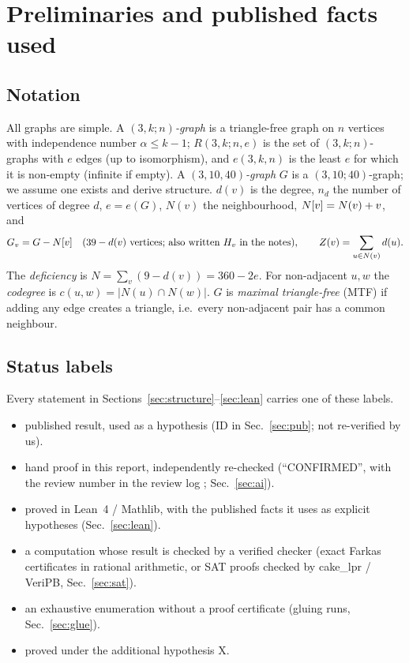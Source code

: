 \section{Preliminaries and published facts used}\label{sec:prelim}

\subsection{Notation}\label{sec:notation}
All graphs are simple. A \emph{$(3,k;n)$-graph} is a triangle-free graph on $n$ vertices with independence number
$\alpha \le k-1$; $R(3,k;n,e)$ is the set of $(3,k;n)$-graphs with $e$ edges (up to isomorphism), and $e(3,k,n)$ is the
least $e$ for which it is non-empty (infinite if empty). A \emph{$(3,10,40)$-graph} $G$ is a $(3,10;40)$-graph; we assume
one exists and derive structure. $d(v)$ is the degree, $n_d$ the number of vertices of degree $d$, $e = e(G)$,
$N(v)$ the neighbourhood, $N[v] = N(v) + v$, and
\[
  G_{v} = G - N[v] \quad (39 - d(v) \text{ vertices; also written } H_v \text{ in the notes}), \qquad Z(v) = \sum_{u \in N(v)} d(u).
\]
The \emph{deficiency} is $N = \sum_v (9 - d(v)) = 360 - 2e$. For non-adjacent $u, w$ the \emph{codegree} is
$c(u,w) = |N(u) \cap N(w)|$. $G$ is \emph{maximal triangle-free} (MTF) if adding any edge creates a triangle,
i.e.\ every non-adjacent pair has a common neighbour.

\subsection{Status labels}\label{sec:status}
Every statement in Sections~\ref{sec:structure}--\ref{sec:lean} carries one of these labels.
\begin{itemize}
\item {} published result, used as a hypothesis (ID in Sec.~\ref{sec:pub}; not re-verified by us).
\item {} hand proof in this report, independently re-checked (``CONFIRMED'', with the
  review number in the review log ; Sec.~\ref{sec:ai}).
\item {} proved in Lean~4 / Mathlib, with the published facts it uses as explicit hypotheses (Sec.~\ref{sec:lean}).
\item {} a computation whose result is checked by a verified checker (exact Farkas certificates in
  rational arithmetic, or SAT proofs checked by cake\_lpr / VeriPB, Sec.~\ref{sec:sat}).
\item {} an exhaustive enumeration without a proof certificate (gluing runs, Sec.~\ref{sec:glue}).
\item {} proved under the additional hypothesis X.
\end{itemize}

